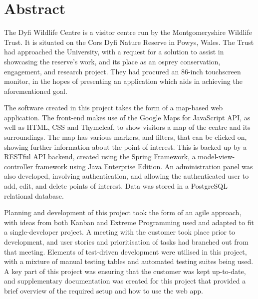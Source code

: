 \thispagestyle{empty}


\section*{\centering Abstract}

The Dyfi Wildlife Centre is a visitor centre run by the Montgomeryshire Wildlife Trust. It is situated on the Cors Dyfi Nature Reserve in Powys, Wales. The Trust had approached the University, with a request for a solution to assist in showcasing the reserve's work, and its place as an osprey conservation, engagement, and research project. They had procured an 86-inch touchscreen monitor, in the hopes of presenting an application which aids in achieving the aforementioned goal.

The software created in this project takes the form of a map-based web application. The front-end makes use of the Google Maps for JavaScript API, as well as HTML, CSS and Thymeleaf, to show visitors a map of the centre and its surroundings. The map has various markers, and filters, that can be clicked on, showing further information about the point of interest. This is backed up by a RESTful API backend, created using the Spring Framework, a model-view-controller framework using Java Enterprise Edition. An administration panel was also developed, involving authentication, and allowing the authenticated user to add, edit, and delete points of interest. Data was stored in a PostgreSQL relational database.

Planning and development of this project took the form of an agile approach, with ideas from both Kanban and Extreme Programming used and adapted to fit a single-developer project. A meeting with the customer took place prior to development, and user stories and prioritisation of tasks had branched out from that meeting. Elements of test-driven development were utilised in this project, with a mixture of manual testing tables and automated testing suites being used. A key part of this project was ensuring that the customer was kept up-to-date, and supplementary documentation was created for this project that provided a brief overview of the required setup and how to use the web app.



